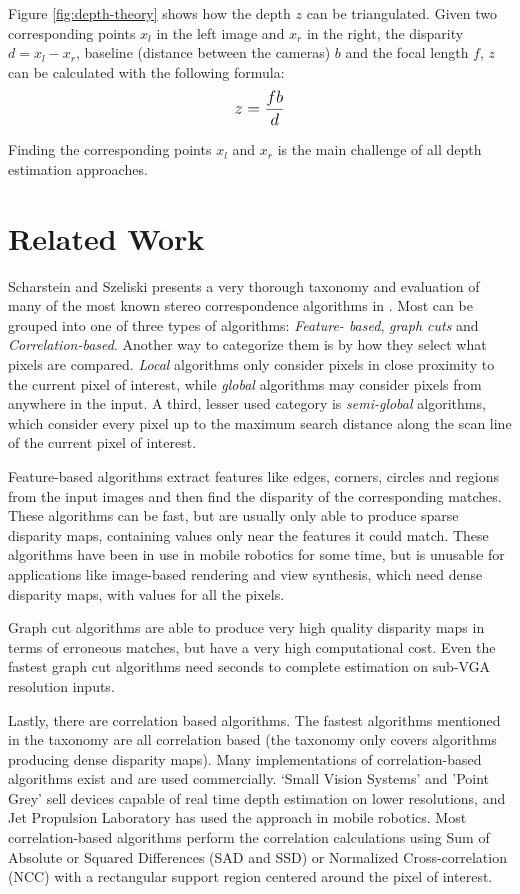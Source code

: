 Figure \ref{fig:depth-theory} shows how the depth $z$ can be
triangulated. Given two corresponding points $x_l$ in the left image
and $x_r$ in the right, the disparity $d = x_l - x_r$, baseline
(distance between the cameras) $b$ and the focal length $f$, $z$ can
be calculated with the following formula:
\[
  \mathlarger{z = \frac{fb}{d}}
\]

Finding the corresponding points $x_{l}$ and $x_{r}$ is the main
challenge of all depth estimation approaches.


\section{Related Work}

Scharstein and Szeliski presents a very thorough taxonomy and evaluation of
many of the most known stereo correspondence algorithms in \cite{taxonomy}.
Most can be grouped into one of three types of algorithms: \textit{Feature-
based}, \textit{graph cuts} and \textit{Correlation-based}. Another way to
categorize them is by how they select what pixels are compared. \textit{Local}
algorithms only consider pixels in close proximity to the current pixel of
interest, while \textit{global} algorithms may consider pixels from anywhere
in the input. A third, lesser used category is \textit{semi-global}
algorithms, which consider every pixel up to the maximum search distance along
the scan line of the current pixel of interest.

Feature-based algorithms\cite{hannah74, marr-poggio79, nishimoto88} extract
features like edges, corners, circles and regions from the input images and
then find the disparity of the corresponding matches. These algorithms can be
fast, but are usually only able to produce sparse disparity maps, containing
values only near the features it could match. These algorithms have been in
use in mobile robotics for some time\cite{feature-based-robotics}, but is
unusable for applications like image-based rendering and view synthesis, which
need dense disparity maps, with values for all the pixels.

Graph cut algorithms\cite{markov98,boykov99,boykov04} are able to produce very
high quality disparity maps in terms of erroneous matches, but have a very
high computational cost. Even the fastest graph cut algorithms need seconds to
complete estimation on sub-VGA resolution inputs.

Lastly, there are correlation based algorithms. The fastest algorithms
mentioned in the taxonomy are all correlation based (the taxonomy only covers
algorithms producing dense disparity maps). Many implementations of
correlation-based algorithms exist and are used commercially. `Small Vision
Systems'\cite{svs98} and 'Point Grey'\cite{pg} sell devices capable of real
time depth estimation on lower resolutions, and Jet Propulsion
Laboratory\cite{jpl1, jpl2} has used the approach in mobile robotics. Most
correlation-based algorithms perform the correlation calculations using Sum of
Absolute or Squared Differences (SAD and SSD)\cite{faugeras93} or Normalized
Cross-correlation (NCC)\cite{ncc93} with a rectangular support region centered
around the pixel of interest.

